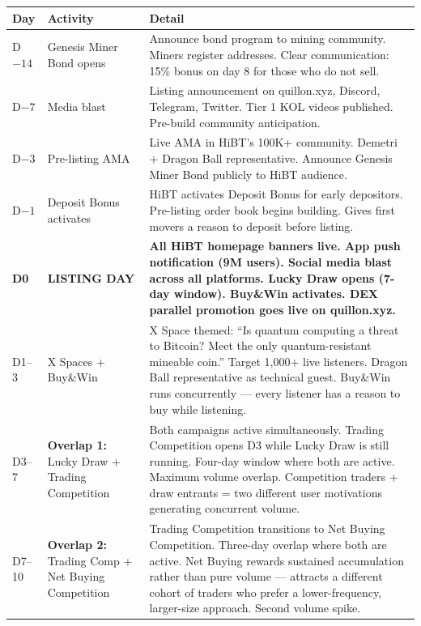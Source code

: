 \documentclass[11pt,a4paper]{article}
\begin{document}
\begin{center}
\begin{longtable}{C{1.4cm} L{3.5cm} L{8cm}}
  \toprule
  \textbf{Day} & \textbf{Activity} & \textbf{Detail} \\
  \midrule
  \endhead\bottomrule\endfoot

  D$-14$ & Genesis Miner Bond opens & Announce bond program to mining community. Miners register addresses. Clear communication: 15\% bonus on day 8 for those who do not sell. \\

  D$-7$ & Media blast & Listing announcement on quillon.xyz, Discord, Telegram, Twitter. Tier 1 KOL videos published. Pre-build community anticipation. \\

  D$-3$ & Pre-listing AMA & Live AMA in HiBT's 100K+ community. Demetri + Dragon Ball representative. Announce Genesis Miner Bond publicly to HiBT audience. \\

  D$-1$ & Deposit Bonus activates & HiBT activates Deposit Bonus for early depositors. Pre-listing order book begins building. Gives first movers a reason to deposit before listing. \\

  \textbf{D0} & \textbf{LISTING DAY} &
    \textbf{All HiBT homepage banners live. App push notification (9M users). Social media blast across all platforms. Lucky Draw opens (7-day window). Buy\&Win activates. DEX parallel promotion goes live on quillon.xyz.} \\

  D1--3 & X Spaces + Buy\&Win & X Space themed: ``Is quantum computing a threat to Bitcoin? Meet the only quantum-resistant mineable coin.'' Target 1,000+ live listeners. Dragon Ball representative as technical guest. Buy\&Win runs concurrently — every listener has a reason to buy while listening. \\

  D3--7 & \textbf{Overlap 1:} Lucky Draw + Trading Competition & Both campaigns active simultaneously. Trading Competition opens D3 while Lucky Draw is still running. Four-day window where both are active. Maximum volume overlap. Competition traders + draw entrants = two different user motivations generating concurrent volume. \\

  D7--10 & \textbf{Overlap 2:} Trading Comp + Net Buying Competition & Trading Competition transitions to Net Buying Competition. Three-day overlap where both are active. Net Buying rewards sustained accumulation rather than pure volume — attracts a different cohort of traders who prefer a lower-frequency, larger-size approach. Second volume spike. \\


\end{longtable}
\end{center}
\end{document}
